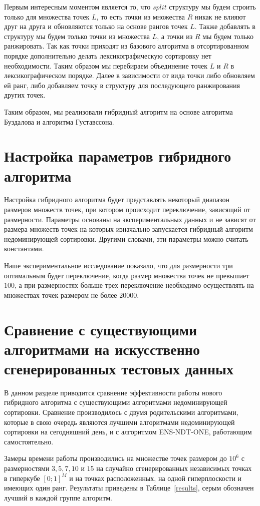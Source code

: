 Первым интересным моментом является то, что $split$ структуру мы будем строить только для множества точек $L$, то есть точки из множества $R$ никак не влияют друг на друга и обновляются только на основе рангов точек $L$. Также добавлять в структуру мы будем только точки из множества $L$, а точки из $R$ мы будем только ранжировать. Так как точки приходят из базового алгоритма в отсортированном порядке дополнительно делать лексикографическую сортировку нет необходимости. Таким образом мы перебираем объединение точек $L$ и $R$ в лексикографическом порядке. Далее в зависимости от вида точки либо обновляем ей ранг, либо добавляем точку в структуру для последующего ранжирования других точек.

Таким образом, мы реализовали гибридный алгоритм на основе алгоритма Буздалова и алгоритма Густавссона. 

\section{Настройка параметров гибридного алгоритма}

Настройка гибридного алгоритма будет представлять некоторый диапазон размеров множеств точек, при котором происходит переключение, зависящий от размерности. Параметры основаны на экспериментальных данных и не зависят от размера множеств точек на которых изначально запускается гибридный алгоритм недоминирующей сортировки. Другими словами, эти параметры можно считать константами. 

Наше экспериментальное исследование показало, что для размерности три оптимальным будет переключение, когда размер множества точек не превышает $100$, а при размерностях больше трех переключение необходимо осуществлять на множествах точек размером не более $20 000$. 

\section{Сравнение с существующими алгоритмами на искусственно сгенерированных тестовых данных}

В данном разделе приводится сравнение эффективности работы нового гибридного алгоритма с существующими алгоритмами недоминирующей сортировки. Сравнение производилось с двумя родительскими алгоритмами, которые в свою очередь являются лучшими алгоритмами недоминирующей сортировки на сегодняшний день, и с алгоритмом ENS-NDT-ONE, работающим самостоятельно.

Замеры времени работы производились на множестве точек размером до $10^6$ с размерностями $3, 5, 7, 10$ и $15$ на случайно сгенерированных независимых точках в гиперкубе $[0; 1]^M$ и на точках расположенных, на одной гиперплоскости и имеющих один ранг. Результаты приведены в Таблице~\ref{results}, серым обозначен лучший в каждой группе алгоритм.

